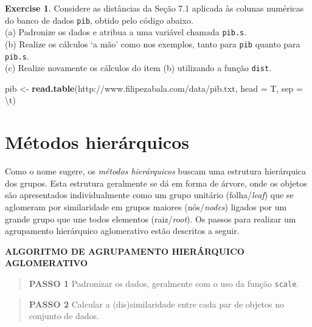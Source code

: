 \documentclass[
]{book}
\newenvironment{Shaded}{\begin{snugshade}}{\end{snugshade}}
\newcommand{\CharTok}[1]{\textcolor[rgb]{0.31,0.60,0.02}{#1}}
\newcommand{\DataTypeTok}[1]{\textcolor[rgb]{0.13,0.29,0.53}{#1}}
\newcommand{\KeywordTok}[1]{\textcolor[rgb]{0.13,0.29,0.53}{\textbf{#1}}}
\newcommand{\NormalTok}[1]{#1}
\newcommand{\StringTok}[1]{\textcolor[rgb]{0.31,0.60,0.02}{#1}}
\theoremstyle{definition}
\theoremstyle{definition}
\theoremstyle{definition}
\newtheorem{exercise}{Exercise}[chapter]
\theoremstyle{remark}
\begin{document}
\begin{exercise}
\protect\hypertarget{exr:unnamed-chunk-156}{}{\label{exr:unnamed-chunk-156} }Considere as distâncias da Seção 7.1 aplicada às colunas numéricas do banco de dados \texttt{pib}, obtido pelo código abaixo.\\
(a) Padronize os dados e atribua a uma variável chamada \texttt{pib.s}.\\
(b) Realize os cálculos `a mão' como nos exemplos, tanto para \texttt{pib} quanto para \texttt{pib.s}.\\
(c) Realize novamente os cálculos do item (b) utilizando a função \texttt{dist}.
\end{exercise}

\begin{Shaded}
\begin{Highlighting}[]
\NormalTok{pib \textless{}{-}}\StringTok{ }\KeywordTok{read.table}\NormalTok{(}\StringTok{\textquotesingle{}http://www.filipezabala.com/data/pib.txt\textquotesingle{}}\NormalTok{, }\DataTypeTok{head =}\NormalTok{ T, }\DataTypeTok{sep =} \StringTok{\textquotesingle{}}\CharTok{\textbackslash{}t}\StringTok{\textquotesingle{}}\NormalTok{)}
\end{Highlighting}
\end{Shaded}

\hypertarget{muxe9todos-hieruxe1rquicos}{%
\section{Métodos hierárquicos}\label{muxe9todos-hieruxe1rquicos}}

Como o nome sugere, os \emph{métodos hierárquicos} buscam uma estrutura hierárquica dos grupos. Esta estrutura geralmente se dá em forma de árvore, onde os objetos são apresentados individualmente como um grupo unitário (folha/\emph{leaf}) que se aglomeram por similaridade em grupos maiores (nós/\emph{nodes}) ligados por um grande grupo que une todos elementos (raiz/\emph{root}). Os passos para realizar um agrupamento hierárquico aglomerativo estão descritos a seguir.

\textbf{ALGORITMO DE AGRUPAMENTO HIERÁRQUICO AGLOMERATIVO}

\begin{quote}
\textbf{PASSO 1} Padronizar os dados, geralmente com o uso da função \texttt{scale}.
\end{quote}

\begin{quote}
\textbf{PASSO 2} Calcular a (dis)similaridade entre cada par de objetos no conjunto de dados.
\end{quote}
\end{document}
